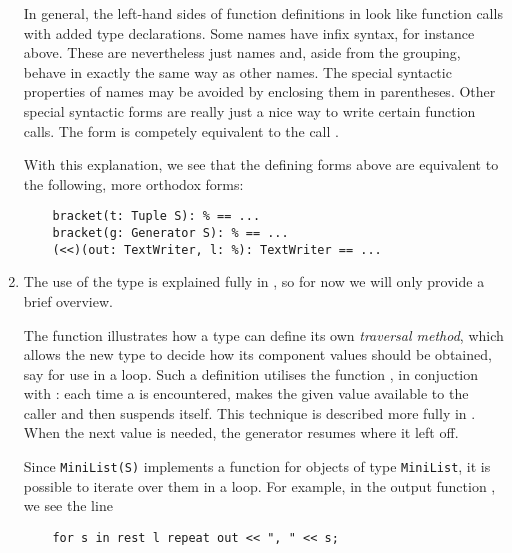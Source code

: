 \begin{enumerate}
In general, the left-hand sides of function definitions in \asharp{}
look like function calls with added type declarations.
Some names have infix syntax, for instance \ttin{<<}
above.  These are nevertheless just names and, aside from the grouping,
behave in exactly the same way as other names.
The special syntactic properties of names may be avoided by
enclosing them in parentheses.
Other special syntactic forms
are really just a nice way to write certain function calls.
The form \ttin{[a,b,c]} is competely equivalent to the call
.

With this explanation, we see that the defining forms above are
equivalent to the following, more orthodox forms:

\begin{verbatim}
    bracket(t: Tuple S): % == ...
    bracket(g: Generator S): % == ...
    (<<)(out: TextWriter, l: %): TextWriter == ...
\end{verbatim}

\item
The use of the type  is explained fully in
, so for now we will only provide a brief
overview.

The function  illustrates how a type can
define its own {\em traversal method}, which allows the new type to 
decide how its component values should be obtained, say for use in a
loop.  Such a definition utilises the function , in 
conjuction with : each time a  is encountered,
 makes the given value available to the caller and then
suspends itself.  This technique is described more fully in 
.
When the next value is needed, the generator resumes where it left off.

Since 
\verb"MiniList(S)" implements a  function for
objects of type \verb"MiniList",
it is possible to iterate over them in a  loop.  For
example, in the output function \ttin{<<}, we see the line

\begin{verbatim}
    for s in rest l repeat out << ", " << s;
\end{verbatim}


\end{enumerate}
